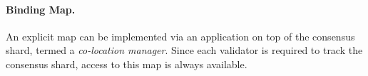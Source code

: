 

\paragraph{Binding Map.}

An explicit map can be implemented via an application on top of the 
consensus shard, termed a \textit{co-location manager}. 
Since each validator is required to
 track the consensus shard, 
access to this map is always available. 



